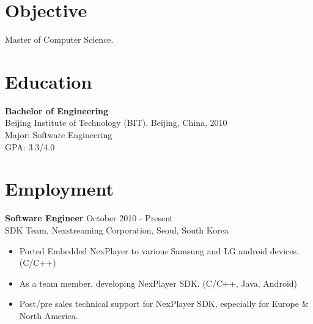 \documentclass[margin]{res}
\begin{document}

\address{  Email: kimcherwoo@gmail.com\\Mobile: (+82)010-8301-0173 \\Work: (+82)02-2194-5187}
\address{  Nexstreaming Corporation \\  2nd Flr, Gwangseong Bldg, \\ 831-47Yeoksamdong Gangnam-gu \\Seoul, South Korea.\\Postcode: 135-080 }


\begin{resume}
 
\section{Objective}  Master of Computer Science. 

\section{Education} {\bf Bachelor of Engineering  } \\
                Beijing Institute of Technology (BIT), Beijing, China,  2010 	\\
                Major: Software Engineering \\
                GPA: 3.3/4.0
 
\section{Employment} 
				{ \bf Software Engineer} \hfill October 2010 - Present \\
                SDK Team, Nexstreaming Corporation, Seoul, South Korea               
                 \begin{itemize}  \itemsep -2pt %
                 \item Ported Embedded NexPlayer to various Samsung and LG android devices.(C/C++)
                \item   As a team member, developing NexPlayer SDK. (C/C++, Java, Android)
				\item   Post/pre sales technical support for NexPlayer SDK, especially for Europe \& North America.
                \end{itemize}
 

\end{resume}
\end{document}
